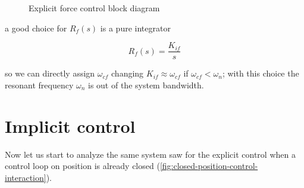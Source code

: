 \begin{figure}[htb]
	\centering
	\caption{Explicit force control block diagram}
	\label{fig:explicit-control-interaction}
\end{figure}

a good choice for $R_f(s)$ is a pure integrator

\[
	R_f(s) = \frac{K_{if}}{s}
\]

so we can directly assign $\omega_{cf}$ changing $K_{if} \approx \omega_{cf}$ if $\omega_{cf} < \omega_n$; with this choice the resonant frequency $\omega_n$ is out of the system bandwidth.

\section{Implicit control}

Now let us start to analyze the same system saw for the explicit control when a control loop on position is already closed (\autoref{fig:closed-position-control-interaction}).

